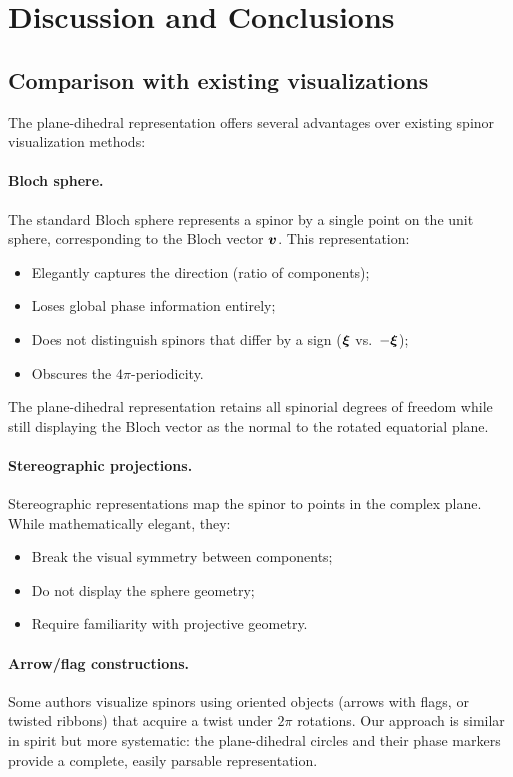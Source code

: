 \section{\label{sec:discussion} Discussion and Conclusions}

\subsection{Comparison with existing visualizations}
\label{sec:disc_comparison}

The plane-dihedral representation offers several advantages over existing spinor visualization methods:

\paragraph{Bloch sphere.}
The standard Bloch sphere represents a spinor by a single point on the unit sphere, corresponding to the Bloch vector $\bm{v}$. This representation:
\begin{itemize}
    \item[\checkmark] Elegantly captures the direction (ratio of components);
    \item[\texttimes] Loses global phase information entirely;
    \item[\texttimes] Does not distinguish spinors that differ by a sign ($\bm{\xi}$ vs.\ $-\bm{\xi}$);
    \item[\texttimes] Obscures the $4\pi$-periodicity.
\end{itemize}
The plane-dihedral representation retains all spinorial degrees of freedom while still displaying the Bloch vector as the normal to the rotated equatorial plane.

\paragraph{Stereographic projections.}
Stereographic representations map the spinor to points in the complex plane. While mathematically elegant, they:
\begin{itemize}
    \item[\texttimes] Break the visual symmetry between components;
    \item[\texttimes] Do not display the sphere geometry;
    \item[\texttimes] Require familiarity with projective geometry.
\end{itemize}

\paragraph{Arrow/flag constructions.}
Some authors visualize spinors using oriented objects (arrows with flags, or twisted ribbons) that acquire a twist under $2\pi$ rotations. Our approach is similar in spirit but more systematic: the plane-dihedral circles and their phase markers provide a complete, easily parsable representation.

